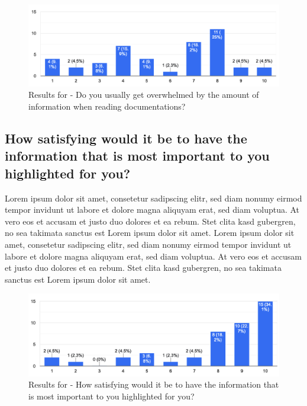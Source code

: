 \begin{figure}[h!]
\centering
\includegraphics[width=\linewidth]{Images/Survey/documents_1.png}
\caption{Results for - Do you usually get overwhelmed by the amount of information when reading documentations?}
\label{fig:results:highlighting:1}
\end{figure}

\subsection{How satisfying would it be to have the information that is most important to you highlighted for you?}
Lorem ipsum dolor sit amet, consetetur sadipscing elitr, sed diam nonumy eirmod tempor invidunt ut labore et dolore magna aliquyam erat, sed diam voluptua. At vero eos et accusam et justo duo dolores et ea rebum. Stet clita kasd gubergren, no sea takimata sanctus est Lorem ipsum dolor sit amet. Lorem ipsum dolor sit amet, consetetur sadipscing elitr, sed diam nonumy eirmod tempor invidunt ut labore et dolore magna aliquyam erat, sed diam voluptua. At vero eos et accusam et justo duo dolores et ea rebum. Stet clita kasd gubergren, no sea takimata sanctus est Lorem ipsum dolor sit amet.
\begin{figure}[h!]
\centering
\includegraphics[width=\linewidth]{Images/Survey/documents_2.png}
\caption{Results for - How satisfying would it be to have the information that is most important to you highlighted for you?}
\label{fig:results:highlighting:2}
\end{figure}


